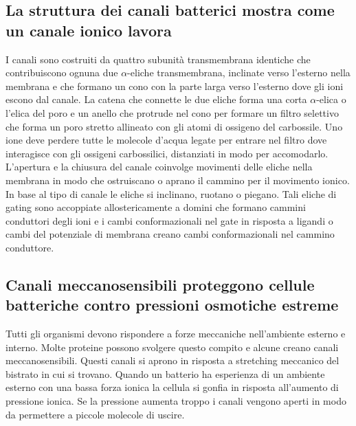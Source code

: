 \subsection{La struttura dei canali batterici  mostra come un canale ionico lavora}
I canali sono costruiti da quattro subunit\`a transmembrana identiche che contribuiscono ognuna due $\alpha$-eliche transmembrana, inclinate verso l'esterno nella membrana e che formano 
un cono con la parte larga verso l'esterno dove gli ioni  escono dal canale. La catena che connette le due eliche forma una corta $\alpha$-elica o l'elica del poro e un 
anello che protrude nel cono per formare un filtro selettivo che forma un poro stretto allineato con gli atomi di ossigeno del carbossile. Uno ione  deve perdere tutte le molecole
d'acqua legate per entrare nel filtro dove interagisce con gli ossigeni carbossilici, distanziati in modo per accomodarlo. L'apertura e la chiusura del canale coinvolge movimenti delle
eliche nella membrana in modo che ostruiscano o aprano il cammino per il movimento ionico. In base al tipo di canale le eliche si inclinano, ruotano o piegano. Tali eliche di gating
sono accoppiate allostericamente a domini che formano cammini conduttori degli ioni  e i cambi conformazionali nel gate in risposta a ligandi o cambi del potenziale di membrana 
creano cambi conformazionali nel cammino conduttore.
\subsection{Canali meccanosensibili proteggono cellule batteriche contro pressioni osmotiche estreme}
Tutti gli organismi devono rispondere a forze meccaniche nell'ambiente esterno e interno. Molte proteine possono svolgere questo compito e alcune creano canali meccanosensibili. 
Questi canali si aprono in risposta a stretching meccanico del bistrato in cui si trovano. Quando un batterio ha esperienza di un ambiente esterno con una bassa forza ionica la cellula si
gonfia in risposta all'aumento di pressione ionica. Se la pressione aumenta troppo i canali vengono aperti in modo da permettere a piccole molecole di uscire. 
